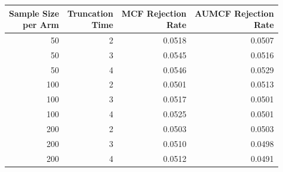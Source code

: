 \begin{tabular}{rrrr}
\toprule
\makecell{Sample Size\\per Arm} &
\makecell{Truncation\\Time} &
\makecell{MCF Rejection\\Rate} &
\makecell{AUMCF Rejection\\Rate} \\
\midrule
50 & 2 & 0.0518 & 0.0507 \\
50 & 3 & 0.0545 & 0.0516 \\
50 & 4 & 0.0546 & 0.0529 \\
\midrule
100 & 2 & 0.0501 & 0.0513 \\
100 & 3 & 0.0517 & 0.0501 \\
100 & 4 & 0.0525 & 0.0501 \\
\midrule
200 & 2 & 0.0503 & 0.0503 \\
200 & 3 & 0.0510 & 0.0498 \\
200 & 4 & 0.0512 & 0.0491 \\
\bottomrule
\end{tabular}
